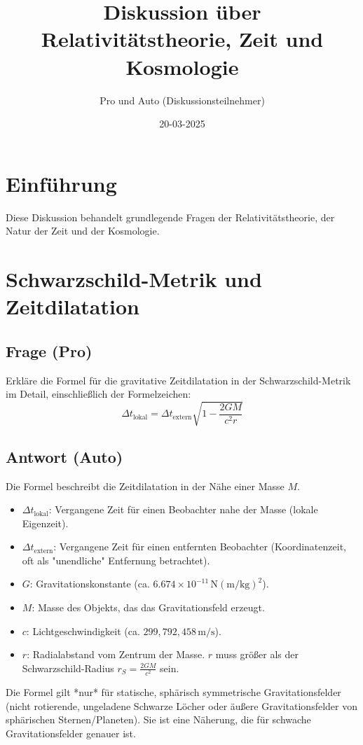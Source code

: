 \documentclass{article}
\title{Diskussion über Relativitätstheorie, Zeit und Kosmologie}
\author{Pro und Auto (Diskussionsteilnehmer)}
\date{20-03-2025}
\begin{document}
	
	\maketitle
	
	\section{Einführung}
	Diese Diskussion behandelt grundlegende Fragen der Relativitätstheorie, der Natur der Zeit und der Kosmologie.
	
	\section{Schwarzschild-Metrik und Zeitdilatation}
	
	\subsection{Frage (Pro)}
	Erkläre die Formel für die gravitative Zeitdilatation in der Schwarzschild-Metrik im Detail, einschließlich der Formelzeichen:
	\[
	\Delta t_{\text{lokal}} = \Delta t_{\text{extern}} \sqrt{1 - \frac{2GM}{c^2 r}}
	\]
	
	\subsection{Antwort (Auto)}
	Die Formel beschreibt die Zeitdilatation in der Nähe einer Masse \(M\).
	\begin{itemize}
		\item \(\Delta t_{\text{lokal}}\): Vergangene Zeit für einen Beobachter nahe der Masse (lokale Eigenzeit).
		\item \(\Delta t_{\text{extern}}\): Vergangene Zeit für einen entfernten Beobachter (Koordinatenzeit, oft als "unendliche" Entfernung betrachtet).
		\item \(G\): Gravitationskonstante (ca. \(6.674 \times 10^{-11} \, \text{N}(\text{m}/\text{kg})^2\)).
		\item \(M\): Masse des Objekts, das das Gravitationsfeld erzeugt.
		\item \(c\): Lichtgeschwindigkeit (ca. \(299,792,458 \, \text{m/s}\)).
		\item \(r\): Radialabstand vom Zentrum der Masse.  \(r\) muss größer als der Schwarzschild-Radius \(r_S = \frac{2GM}{c^2}\) sein.
	\end{itemize}
	Die Formel gilt *nur* für statische, sphärisch symmetrische Gravitationsfelder (nicht rotierende, ungeladene Schwarze Löcher oder äußere Gravitationsfelder von sphärischen Sternen/Planeten). Sie ist eine Näherung, die für schwache Gravitationsfelder genauer ist.
	
\end{document}
